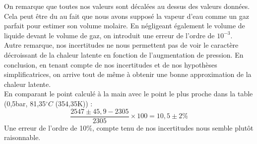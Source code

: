 \documentclass[12pt,a4paper]{article}
\begin{document}
On remarque que toutes nos valeurs sont décalées au dessus des valeurs données. Cela peut être du au fait que nous avons supposé la vapeur d'eau comme un gaz parfait pour estimer son volume molaire. En négligeant également le volume de liquide devant le volume de gaz, on introduit une erreur de l'ordre de $10^{-3}$.\\
Autre remarque, nos incertitudes ne nous permettent pas de voir le caractère décroissant de la chaleur latente en fonction de l'augmentation de pression.
En conclusion, en tenant compte de nos incertitudes et de nos hypothèses simplificatrices, on arrive tout de même à obtenir une bonne approximation de la chaleur latente.\\
En comparant le point calculé à la main avec le point le plus proche dans la table (0,5bar, 81,35$^\circ C$ (354,35K)) : 
$$\dfrac{2547\pm45,9-2305}{2305}\times100=10,5\pm2 \% $$
Une erreur de l'ordre de 10\%, compte tenu de nos incertitudes nous semble plutôt raisonnable.
\end{document}
